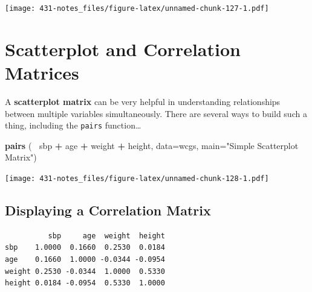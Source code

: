 \documentclass[
]{book}
\newenvironment{Shaded}{\begin{snugshade}}{\end{snugshade}}
\newcommand{\CommentTok}[1]{\textcolor[rgb]{0.56,0.35,0.01}{\textit{#1}}}
\newcommand{\DataTypeTok}[1]{\textcolor[rgb]{0.13,0.29,0.53}{#1}}
\newcommand{\DecValTok}[1]{\textcolor[rgb]{0.00,0.00,0.81}{#1}}
\newcommand{\KeywordTok}[1]{\textcolor[rgb]{0.13,0.29,0.53}{\textbf{#1}}}
\newcommand{\NormalTok}[1]{#1}
\newcommand{\OperatorTok}[1]{\textcolor[rgb]{0.81,0.36,0.00}{\textbf{#1}}}
\newcommand{\StringTok}[1]{\textcolor[rgb]{0.31,0.60,0.02}{#1}}
\begin{document}
\texttt{[image: 431-notes\_files/figure-latex/unnamed-chunk-127-1.pdf]}

\hypertarget{scatterplot-and-correlation-matrices}{%
\section{Scatterplot and Correlation Matrices}\label{scatterplot-and-correlation-matrices}}

A \textbf{scatterplot matrix} can be very helpful in understanding relationships between multiple variables simultaneously. There are several ways to build such a thing, including the \texttt{pairs} function\ldots{}

\begin{Shaded}
\begin{Highlighting}[]
\KeywordTok{pairs}\NormalTok{ (}\OperatorTok{~}\StringTok{ }\NormalTok{sbp }\OperatorTok{+}\StringTok{ }\NormalTok{age }\OperatorTok{+}\StringTok{ }\NormalTok{weight }\OperatorTok{+}\StringTok{ }\NormalTok{height, }\DataTypeTok{data=}\NormalTok{wcgs, }\DataTypeTok{main=}\StringTok{"Simple Scatterplot Matrix"}\NormalTok{)}
\end{Highlighting}
\end{Shaded}

\texttt{[image: 431-notes\_files/figure-latex/unnamed-chunk-128-1.pdf]}

\hypertarget{displaying-a-correlation-matrix}{%
\subsection{Displaying a Correlation Matrix}\label{displaying-a-correlation-matrix}}

\begin{Shaded}
\end{Shaded}

\begin{verbatim}
          sbp     age  weight  height
sbp    1.0000  0.1660  0.2530  0.0184
age    0.1660  1.0000 -0.0344 -0.0954
weight 0.2530 -0.0344  1.0000  0.5330
height 0.0184 -0.0954  0.5330  1.0000
\end{verbatim}
\end{document}
